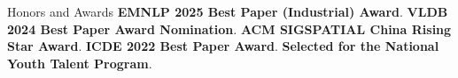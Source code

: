 \begin{rubric}{Honors and Awards}
\entry*[2025]%
	\textbf{EMNLP 2025 Best Paper (Industrial) Award}.
\entry*[2024]%
	\textbf{VLDB 2024 Best Paper Award Nomination}.
\entry*[2023]%
	\textbf{ACM SIGSPATIAL China Rising Star Award}.
\entry*[2022]%
	\textbf{ICDE 2022 Best Paper Award}.
\entry*[2022]%
	\textbf{Selected for the National Youth Talent Program}.
\end{rubric}
